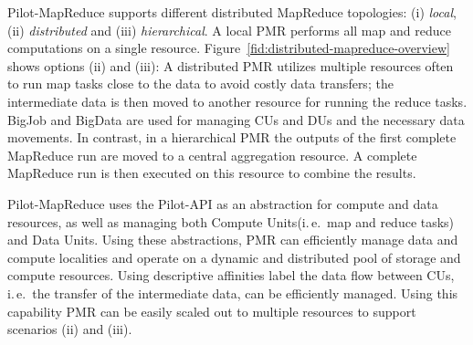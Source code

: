 \documentclass{acm_proc_article-sp}
\newcommand{\jhanote}[1]{ {\textcolor{red} { ***SJ: #1 }}}
\newcommand{\alnote}[1]{ {\textcolor{blue} { ***andreL: #1 }}}
\newcommand{\alnote}[1]{}
\newcommand{\jhanote}[1]{}
\newcommand{\pilotmapreduce}{Pilot-MapReduce\xspace}
\newcommand{\computeunits}{Compute Units\xspace}
\newcommand{\dataunits}{Data Units\xspace}
\begin{document}
\pilotmapreduce supports different distributed MapReduce topologies:
(i) \emph{local}, (ii) \emph{distributed} and (iii)
\emph{hierarchical}. A local PMR performs all map and reduce
computations on a single resource.
Figure~\ref{fid:distributed-mapreduce-overview} shows options (ii) and
(iii): A distributed PMR utilizes multiple resources often to run map
tasks close to the data to avoid costly data transfers; the
intermediate data is then moved to another resource for running the
reduce tasks. BigJob and BigData are used for managing CUs and DUs and
the necessary data movements. In contrast, in a hierarchical PMR the
outputs of the first complete MapReduce run are moved to a central
aggregation resource. A complete MapReduce run is then executed on
this resource to combine the results. %


\pilotmapreduce uses the Pilot-API as an abstraction for compute and data
resources, as well as managing both \computeunits (i.\,e.\ map and reduce tasks)
and \dataunits. Using these abstractions, PMR can efficiently manage data and
compute localities and operate on a dynamic and distributed pool of storage and
compute resources. Using descriptive affinities label the data flow between CUs,
i.\,e.\ the transfer of the intermediate data, can be efficiently managed. Using
this capability PMR can be easily scaled out to multiple resources to support
scenarios (ii) and (iii).



\end{document}
